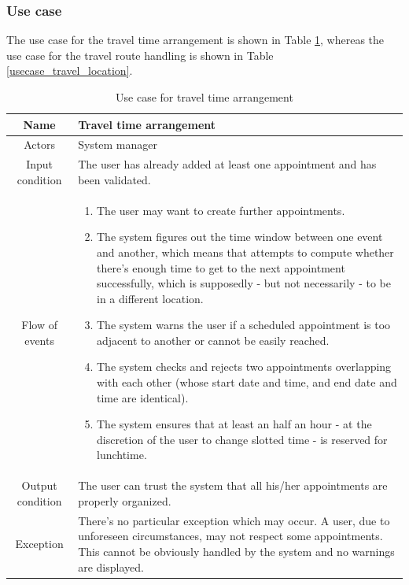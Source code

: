 \subsubsection{Use case}
The use case for the travel time arrangement is shown in Table \ref{usecase_traveltime}, whereas the use case for the travel route handling is shown in Table \ref{usecase_travel_location}.
\begin{table}
\centering
	\begin{tabular}{|c||p{}|}
		\hline
		Name & Travel time arrangement \\ \hline
		Actors & System manager \\ \hline
		Input condition & The user has already added at least one appointment and has been validated. \\ \hline
		Flow of events & \begin{enumerate}
			\item The user may want to create further appointments.
			\item The system figures out the time window between one event and another, which means that attempts to compute whether there's enough time to get to the next appointment successfully, which is supposedly - but not necessarily - to be in a different location.
			\item The system warns the user if a scheduled appointment is too adjacent to another or cannot be easily reached.
			\item The system checks and rejects two appointments overlapping with each other (whose start date and time, and end date  and time are identical).
            \item The system ensures that at least an half an hour - at the discretion of the user to change slotted time - is reserved for lunchtime.
		\end{enumerate} \\ \hline
		Output condition & The user can trust the system that all his/her appointments are properly organized. \\ \hline
		Exception & There's no particular exception which may occur. A user, due to unforeseen circumstances, may not respect some appointments. This cannot be obviously handled by the system and no warnings are displayed.  \\ \hline		
	\end{tabular}
\caption{Use case for travel time arrangement}
\label{usecase_traveltime}
\end{table}

